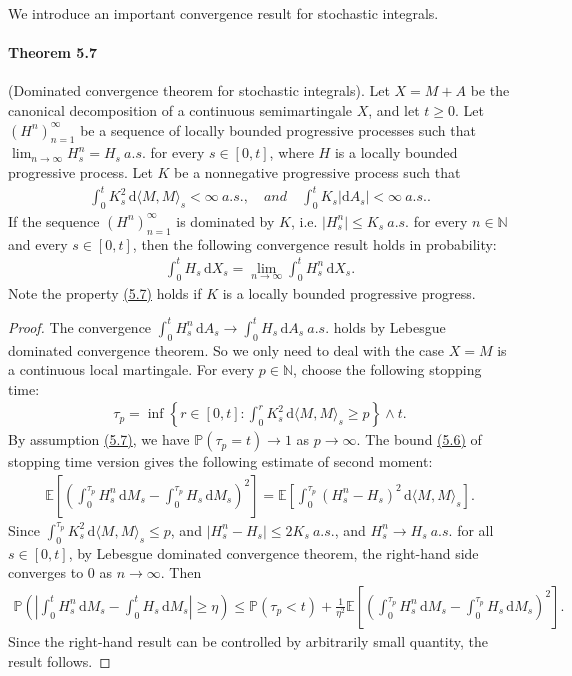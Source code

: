 \documentclass{article}
\numberwithin{equation}{section}
\newcommand{\E}{\mathbb{E}}
\renewcommand{\P}{\mathbb{P}}
\renewcommand{\d}{\mathrm{d}}
\theoremstyle{plain}
\theoremstyle{definition}
\begin{document}
We introduce an important convergence result for stochastic integrals.

\paragraph{Theorem 5.7\label{thm:5.7}} (Dominated convergence theorem for stochastic integrals). Let $X=M+A$ be the canonical decomposition of a continuous semimartingale $X$, and let $t\geq 0$. Let $(H^n)_{n=1}^\infty$ be a sequence of locally bounded progressive processes such that $\lim_{n\to\infty} H^n_s= H_s\ a.s.$ for every $s\in[0,t]$, where $H$ is a locally bounded progressive process. Let $K$ be a nonnegative progressive process such that 
\begin{align*}
	\int_0^t K_s^2\,\d \langle M,M\rangle_s<\infty\ a.s.,\quad\textit{and}\quad \int_0^t K_s\left\vert \d A_s\right\vert<\infty\ a.s..\tag{5.7}\label{eq:5.7}
\end{align*}
If the sequence $(H^n)_{n=1}^\infty$ is dominated by $K$, i.e. $\vert H^n_s\vert\leq K_s\ a.s.$ for every $n\in\mathbb{N}$ and every $s\in[0,t]$, then the following convergence result holds in probability:
\begin{align*}
	\int_0^t H_s\,\d X_s = \lim_{n\to\infty}\int_0^t H_s^n\,\d X_s.
\end{align*}
Note the property \hyperref[eq:5.7]{(5.7)} holds if $K$ is a locally bounded progressive progress.
\begin{proof}
The convergence $\int_0^t H_s^n\,\d A_s\to\int_0^t H_s\,\d A_s\ a.s.$ holds by Lebesgue dominated convergence theorem. So we only need to deal with the case $X=M$ is a continuous local martingale. For every $p\in\mathbb{N}$, choose the following stopping time:
\begin{align*}
	\tau_p = \inf\left\{r\in[0,t]:\int_0^r K_s^2\,\d \langle M,M\rangle_s\geq p\right\}\wedge t.
\end{align*}
By assumption \hyperref[eq:5.7]{(5.7)}, we have $\P(\tau_p=t)\to 1$ as $p\to\infty$. The bound \hyperref[eq:5.6]{(5.6)} of stopping time version gives the following estimate of second moment:
\begin{align*}
	\E\left[\left(\int_0^{\tau_p} H_s^n\,\d M_s-\int_0^{\tau_p} H_s\,\d M_s\right)^2\right]=\E\left[\int_0^{\tau_p} (H_s^n- H_s)^2\,\d \langle M,M\rangle_s\right].
\end{align*}
Since $\int_0^{\tau_p} K_s^2\,\d \langle M,M\rangle_s\leq p$, and $\vert H_s^n-H_s\vert\leq 2K_s\ a.s.$, and $H_s^n\to H_s\ a.s.$ for all $s\in[0,t]$, by Lebesgue dominated convergence theorem, the right-hand side converges to $0$ as $n\to\infty$. Then
\begin{align*}
	\P\left(\left\vert\int_0^t H_s^n\,\d M_s-\int_0^t H_s\,\d M_s\right\vert\geq\eta\right)\leq\P(\tau_p<t) + \frac{1}{\eta^2}\E\left[\left(\int_0^{\tau_p} H_s^n\,\d M_s-\int_0^{\tau_p} H_s\,\d M_s\right)^2\right].
\end{align*}
Since the right-hand result can be controlled by arbitrarily small quantity, the result follows.
\end{proof}
\end{document}
